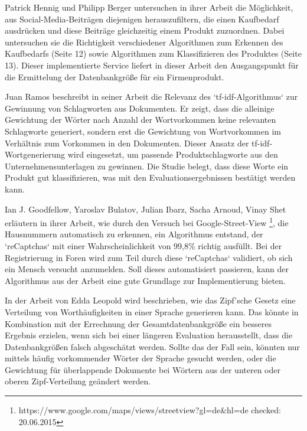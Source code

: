 Patrick Hennig und Philipp Berger \cite{n2o} untersuchen in ihrer Arbeit die Möglichkeit, aus Social-Media-Beiträgen diejenigen herauszufiltern, die einen Kaufbedarf ausdrücken und diese Beiträge gleichzeitig einem Produkt zuzuordnen. Dabei untersuchen sie die Richtigkeit verschiedener Algorithmen zum Erkennen des Kaufbedarfs (Seite 12) sowie Algorithmen zum Klassifizieren des Produktes (Seite 13). Dieser implementierte Service liefert in dieser Arbeit den Ausgangspunkt für die Ermittelung der Datenbankgröße für ein Firmenprodukt.

Juan Ramos \cite{ramos2003using} beschreibt in seiner Arbeit die Relevanz des `tf-idf-Algorithmus` zur Gewinnung von Schlagworten aus Dokumenten. Er zeigt, dass die alleinige Gewichtung der Wörter nach Anzahl der Wortvorkommen keine relevanten Schlagworte generiert, sondern erst die Gewichtung von Wortvorkommen im Verhältnis zum Vorkommen in den Dokumenten. Dieser Ansatz der tf-idf-Wortgenerierung wird eingesetzt, um passende Produktschlagworte aus den Unternehmensunterlagen zu gewinnen. Die Studie belegt, dass diese Worte ein Produkt gut klassifizieren, was mit den Evaluationsergebnissen bestätigt werden kann.

Ian J. Goodfellow, Yaroslav Bulatov, Julian Ibarz, Sacha Arnoud, Vinay Shet \cite{goodfellow2013multi} erläutern in ihrer Arbeit, wie durch den Versuch bei Google-Street-View \footnote{https://www.google.com/maps/views/streetview?gl=de\&hl=de checked: 20.06.2015}, die Hausnummern automatisch zu erkennen, ein Algorithmus entstand, der `reCaptchas` mit einer Wahrscheinlichkeit von 99,8\% richtig ausfüllt. Bei der Registrierung in Foren wird zum Teil durch diese `reCaptchas` validiert, ob sich ein Mensch versucht anzumelden. Soll dieses automatisiert passieren, kann der Algorithmus aus der Arbeit eine gute Grundlage zur Implementierung bieten.

In der Arbeit von Edda Leopold \cite{leopold2002zipfsche} wird beschrieben, wie das Zipf'sche Gesetz eine Verteilung von Worthäufigkeiten in einer Sprache generieren kann. Das könnte in Kombination mit der Errechnung der Gesamtdatenbankgröße ein besseres Ergebnis erzielen, wenn sich bei einer längeren Evaluation herausstellt, dass die Datenbankgrößen falsch abgeschätzt werden. Sollte das der Fall sein, könnten nur mittels häufig vorkommender Wörter der Sprache gesucht werden, oder die Gewichtung für überlappende Dokumente bei Wörtern aus der unteren oder oberen Zipf-Verteilung geändert werden. 

